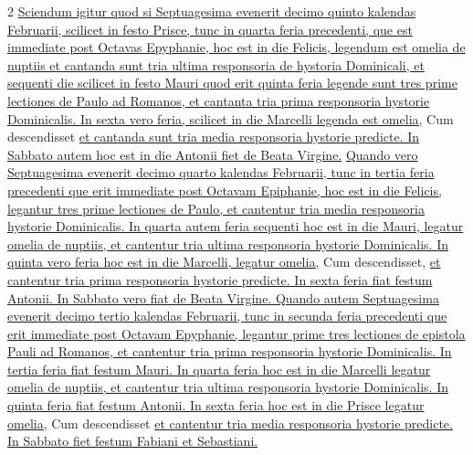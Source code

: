 \begin{multicols*}{2}
\newline \ul{Sciendum igitur quod si Septuagesima evenerit decimo quinto kalendas Februarii, scilicet in festo Prisce, tunc in quarta feria precedenti, que est immediate post Octavas Epyphanie, hoc est in die Felicis, legendum est omelia de nuptiis et cantanda sunt tria ultima responsoria de hystoria Dominicali, et sequenti die scilicet in festo Mauri quod erit quinta feria legende sunt tres prime lectiones de Paulo ad Romanos, et cantanta tria prima responsoria hystorie Dominicalis. In sexta vero feria, scilicet in die Marcelli legenda est omelia,} Cum descendisset \ul{et cantanda sunt tria media responsoria hystorie predicte. In Sabbato autem hoc est in die Antonii fiet de Beata Virgine.}
\newline \ul{Quando vero Septuagesima evenerit decimo quarto kalendas Februarii, tunc in tertia feria precedenti que erit immediate post Octavam Epiphanie, hoc est in die Felicis, legantur tres prime lectiones de Paulo, et cantentur tria media responsoria hystorie Dominicalis. In quarta autem feria sequenti hoc est in die Mauri, legatur omelia de nuptiis, et cantentur tria ultima responsoria hystorie Dominicalis. In quinta vero feria hoc est in die Marcelli, legatur omelia,} Cum descendisset, \ul{et cantentur tria prima responsoria hystorie predicte. In sexta feria fiat festum Antonii. In Sabbato vero fiat de Beata Virgine.
Quando autem Septuagesima evenerit decimo tertio kalendas Februarii, tunc in secunda feria precedenti que erit immediate post Octavam Epyphanie, legantur prime tres lectiones de epistola Pauli ad Romanos, et cantentur tria prima responsoria hystorie Dominicalis. In tertia feria fiat festum Mauri. In quarta feria hoc est in die Marcelli legatur omelia de nuptiis, et cantentur tria ultima responsoria hystorie Dominicalis. In quinta feria fiat festum Antonii. In sexta feria hoc est in die Prisce legatur omelia,} Cum descendisset \ul{et cantentur tria media responsoria hystorie predicte. In Sabbato fiet festum Fabiani et Sebastiani.}
{\color{Red} }

\end{multicols*}
